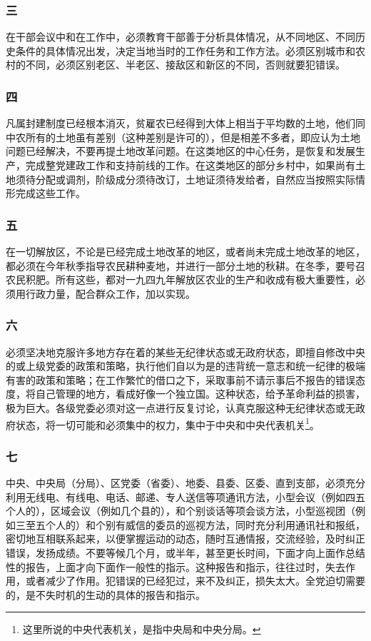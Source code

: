 \documentclass[cn,11pt,chinese]{elegantbook}
\def\myformat#1{\hfil\hfil #1}
\begin{document}
\subsubsection*{\myformat{三}}
在干部会议中和在工作中，必须教育干部善于分析具体情况，从不同地区、不同历史条件的具体情况出发，决定当地当时的工作任务和工作方法。必须区别城市和农村的不同，必须区别老区、半老区、接敌区和新区的不同，否则就要犯错误。\\
\subsubsection*{\myformat{四}}
凡属封建制度已经根本消灭，贫雇农已经得到大体上相当于平均数的土地，他们同中农所有的土地虽有差别（这种差别是许可的），但是相差不多者，即应认为土地问题已经解决，不要再提土地改革问题。在这类地区的中心任务，是恢复和发展生产，完成整党建政工作和支持前线的工作。在这类地区的部分乡村中，如果尚有土地须待分配或调剂，阶级成分须待改订，土地证须待发给者，自然应当按照实际情形完成这些工作。\\
\subsubsection*{\myformat{五}}
在一切解放区，不论是已经完成土地改革的地区，或者尚未完成土地改革的地区，都必须在今年秋季指导农民耕种麦地，并进行一部分土地的秋耕。在冬季，要号召农民积肥。所有这些，都对一九四九年解放区农业的生产和收成有极大重要性，必须用行政力量，配合群众工作，加以实现。\\
\subsubsection*{\myformat{六}}
必须坚决地克服许多地方存在着的某些无纪律状态或无政府状态，即擅自修改中央的或上级党委的政策和策略，执行他们自以为是的违背统一意志和统一纪律的极端有害的政策和策略；在工作繁忙的借口之下，采取事前不请示事后不报告的错误态度，将自己管理的地方，看成好像一个独立国。这种状态，给予革命利益的损害，极为巨大。各级党委必须对这一点进行反复讨论，认真克服这种无纪律状态或无政府状态，将一切可能和必须集中的权力，集中于中央和中央代表机关\footnote[1]{ 这里所说的中央代表机关，是指中央局和中央分局。}。\\
\subsubsection*{\myformat{七}}
中央、中央局（分局）、区党委（省委）、地委、县委、区委、直到支部，必须充分利用无线电、有线电、电话、邮递、专人送信等项通讯方法，小型会议（例如四五个人的），区域会议（例如几个县的），和个别谈话等项会谈方法，小型巡视团（例如三至五个人的）和个别有威信的委员的巡视方法，同时充分利用通讯社和报纸，密切地互相联系起来，以便掌握运动的动态，随时互通情报，交流经验，及时纠正错误，发扬成绩。不要等候几个月，或半年，甚至更长时间，下面才向上面作总结性的报告，上面才向下面作一般性的指示。这种报告和指示，往往过时，失去作用，或者减少了作用。犯错误的已经犯过，来不及纠正，损失太大。全党迫切需要的，是不失时机的生动的具体的报告和指示。\\
\end{document}

